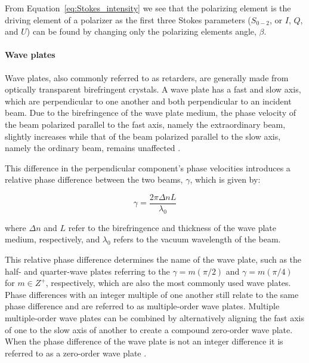 From Equation~\ref{eq:Stokes_intensity} we see that the polarizing element is the driving element of a polarizer as the first three Stokes parameters ($S_{0-2}$, or $I$, $Q$, and $U$) can be found by changing only the polarizing elements angle, $\beta$.

\paragraph{Wave plates}
Wave plates, also commonly referred to as retarders, are generally made from optically transparent birefringent crystals. A wave plate has a fast and slow axis, which are perpendicular to one another and both perpendicular to an incident beam. Due to the birefringence of the wave plate medium, the phase velocity of the beam polarized parallel to the fast axis, namely the extraordinary beam, slightly increases while that of the beam polarized parallel to the slow axis, namely the ordinary beam, remains unaffected \citep{Hecht_optics}.
\prgph

This difference in the perpendicular component's phase velocities introduces a relative phase difference between the two beams, $\gamma$, which is given by:

\begin{equation}
    \gamma = \frac{2 \pi \Delta n L}{\lambda_{0}}
\end{equation}

\noindent where $\Delta n$ and $L$ refer to the birefringence and thickness of the wave plate medium, respectively, and $\lambda_{0}$ refers to the vacuum wavelength of the beam.
\prgph

This relative phase difference determines the name of the wave plate, such as the half- and quarter-wave plates referring to the $\gamma = m(\pi/2) $ and $\gamma = m(\pi/4)$ for $m \in Z^{+}$, respectively, which are also the most commonly used wave plates. Phase differences with an integer multiple of one another still relate to the same phase difference and are referred to as multiple-order wave plates. Multiple multiple-order wave plates can be combined by alternatively aligning the fast axis of one to the slow axis of another to create a compound zero-order wave plate. When the phase difference of the wave plate is not an integer difference it is referred to as a zero-order wave plate \citep{Hale_birefringence}.

